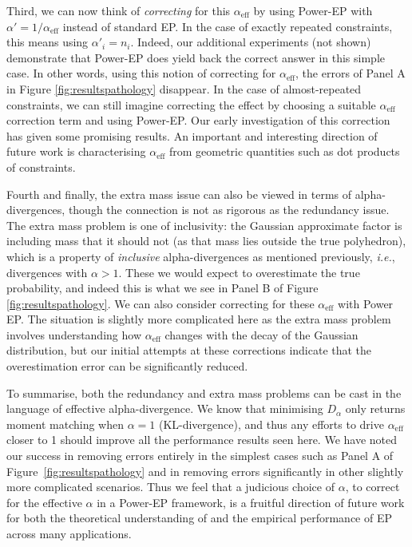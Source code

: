 \documentclass[twoside,11pt]{article}
\begin{document}
Third, we can now think of \emph{correcting} for this $\alpha_\text{eff}$ by using Power-EP with $\alpha' = 1/\alpha_\text{eff}$ instead of standard EP. In the case of exactly repeated constraints, this means using $\alpha'_i = n_i$.  Indeed, our additional experiments (not shown) demonstrate that Power-EP does yield back the correct answer in this simple case. In other words, using this notion of correcting for $\alpha_{\text{eff}}$, the errors of Panel A in Figure \ref{fig:resultspathology} disappear.   In the case of almost-repeated constraints, we can still imagine correcting the effect by choosing a suitable $\alpha_\text{eff}$ correction term and using Power-EP.  Our early investigation of this correction has given some promising results.   An important and interesting direction of future work is characterising $\alpha_\text{eff}$ from geometric quantities such as dot products of constraints. 

Fourth and finally, the extra mass issue can also be viewed in terms of alpha-divergences, though the connection is not as rigorous as the redundancy issue.  The extra mass problem is one of inclusivity: the Gaussian approximate factor is including mass that it should not (as that mass lies outside the true polyhedron), which is a property of \emph{inclusive} alpha-divergences as mentioned previously, {\it i.e.}, divergences with $\alpha > 1$.  These we would expect to overestimate the true probability, and indeed this is what we see in Panel B of Figure \ref{fig:resultspathology}.  We can also consider correcting for these $\alpha_{\text{eff}}$ with Power EP.  The situation is slightly more complicated here as the extra mass problem involves understanding how $\alpha_{\text{eff}}$ changes with the decay of the Gaussian distribution, but our initial attempts at these corrections indicate that the overestimation error can be significantly reduced.

To summarise, both the redundancy and extra mass problems can be cast in the language of effective alpha-divergence. We know that minimising $D_{\alpha}$ only returns moment matching when $\alpha = 1$ (KL-divergence), and thus any efforts to drive $\alpha_{\text{eff}}$ closer to 1 should improve all the performance results seen here.  We have noted our success in removing errors entirely in the simplest cases such as Panel A of Figure~\ref{fig:resultspathology} and in removing errors significantly in other slightly more complicated scenarios.  Thus we feel that a judicious choice of $\alpha$, to correct for the effective $\alpha$ in a Power-EP framework, is a fruitful direction of future work for both the theoretical understanding of and the empirical performance of EP across many applications.
\end{document}

